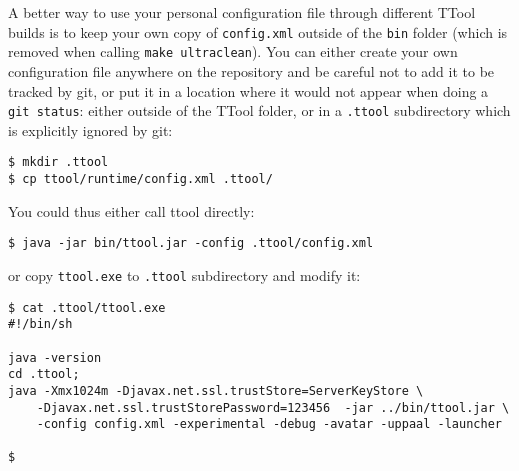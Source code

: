 \documentclass[12pt]{article}
\begin{document}
A better way to use your personal configuration file through different TTool
builds is to keep your own copy of \texttt{config.xml} outside of the
\texttt{bin} folder (which is removed when calling \texttt{make ultraclean}).
You can either create your own configuration file anywhere on the repository and
be careful not to add it to be tracked by git, or put it in a location where it
would not appear when doing a \texttt{git status}: either outside of the TTool
folder, or in a \texttt{.ttool} subdirectory which is explicitly ignored by git:
\begin{verbatim}
$ mkdir .ttool
$ cp ttool/runtime/config.xml .ttool/
\end{verbatim}
You could thus either call ttool directly:
\begin{verbatim}
$ java -jar bin/ttool.jar -config .ttool/config.xml
\end{verbatim}
or copy \texttt{ttool.exe} to \texttt{.ttool} subdirectory and modify it:
\begin{verbatim}
$ cat .ttool/ttool.exe
#!/bin/sh

java -version
cd .ttool;
java -Xmx1024m -Djavax.net.ssl.trustStore=ServerKeyStore \
    -Djavax.net.ssl.trustStorePassword=123456  -jar ../bin/ttool.jar \
    -config config.xml -experimental -debug -avatar -uppaal -launcher

$
\end{verbatim}

\newpage
\end{document}
